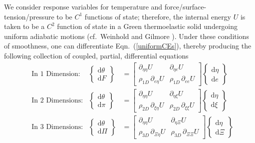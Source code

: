 We consider response variables for temperature and force\slash surface-tension\slash pressure to be $C^1$ functions of state; therefore, the internal energy $U$ is taken to be a $C^2$ function of state in a Green thermo\-elastic solid undergoing uniform adiabatic motions (cf.\ Weinhold \cite{Weinhold75c} and Gilmore \cite{Gilmore84}).  Under these conditions of smoothness, one can differentiate Eqn.~(\ref{uniformCEs}), thereby producing the following collection of coupled, partial, differential equations
\begin{subequations}
    \label{GreenElasticODEs}
    \begin{align}
    \mbox{} & \text{In 1 Dimension:} &
    \left\{ \begin{matrix} \mathrm{d} \theta \\ 
    \mathrm{d} F \end{matrix} \right\} & = \begin{bmatrix}
    \partial_{\eta\eta} U & \partial_{\eta e} U \\
    \rho_{1D} \, \partial_{e \eta} U & \rho_{1D} \, \partial_{ee} U \end{bmatrix} 
    \left\{ \begin{matrix} \mathrm{d} \eta \\
    \mathrm{d} e \end{matrix} \right\} \\
    \mbox{} & \text{In 2 Dimensions:} &
    \left\{ \begin{matrix} \mathrm{d} \theta \\ 
    \mathrm{d} \pi \end{matrix} \right\} & = \begin{bmatrix}
    \partial_{\eta\eta} U & \partial_{\eta \xi} U \\
    \rho_{2D} \, \partial_{\xi\eta} U & \rho_{2D} \, \partial_{\xi\xi} U \end{bmatrix} \left\{ \begin{matrix} \mathrm{d} \eta \\
    \mathrm{d} \xi \end{matrix} \right\} \label{GreenMembrane} \\
    \mbox{} & \text{In 3 Dimensions:} &
    \left\{ \begin{matrix} \mathrm{d} \theta \\ 
    \mathrm{d} \Pi \end{matrix} \right\} & = \begin{bmatrix}
    \partial_{\eta\eta} U & \partial_{\eta\Xi} U \\
    \rho_{3D} \, \partial_{\Xi \eta} U & \rho_{3D} \, \partial_{\Xi\Xi} U \end{bmatrix} \left\{ \begin{matrix} \mathrm{d} \eta \\
    \mathrm{d} \Xi \end{matrix} \right\} \label{GreenSolid}
    \end{align}
\end{subequations}
